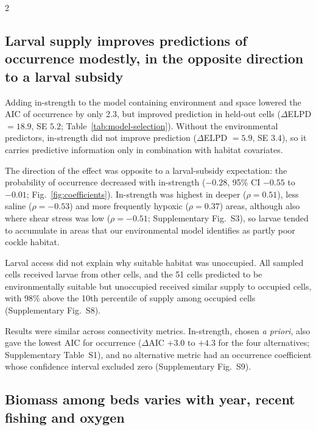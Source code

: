 \begin{spacing}{2}
\subsection{Larval supply improves predictions of occurrence modestly, in the opposite direction to a larval subsidy}

Adding in-strength to the model containing environment and space lowered the AIC of occurrence by only 2.3, but improved prediction in held-out cells ($\Delta$ELPD $=18.9$, SE $5.2$; Table~\ref{tab:model-selection}). Without the environmental predictors, in-strength did not improve prediction ($\Delta$ELPD $=5.9$, SE $3.4$), so it carries predictive information only in combination with habitat covariates.

The direction of the effect was opposite to a larval-subsidy expectation: the probability of occurrence decreased with in-strength ($-0.28$, 95\% CI $-0.55$ to $-0.01$; Fig.~\ref{fig:coefficients}). In-strength was highest in deeper ($\rho=0.51$), less saline ($\rho=-0.53$) and more frequently hypoxic ($\rho=0.37$) areas, although also where shear stress was low ($\rho=-0.51$; Supplementary Fig.~S3), so larvae tended to accumulate in areas that our environmental model identifies as partly poor cockle habitat.

Larval access did not explain why suitable habitat was unoccupied. All sampled cells received larvae from other cells, and the 51 cells predicted to be environmentally suitable but unoccupied received similar supply to occupied cells, with 98\% above the 10th percentile of supply among occupied cells (Supplementary Fig.~S8).

Results were similar across connectivity metrics. In-strength, chosen \emph{a priori}, also gave the lowest AIC for occurrence ($\Delta$AIC $+3.0$ to $+4.3$ for the four alternatives; Supplementary Table~S1), and no alternative metric had an occurrence coefficient whose confidence interval excluded zero (Supplementary Fig.~S9).

\subsection{Biomass among beds varies with year, recent fishing and oxygen}


\end{spacing}
